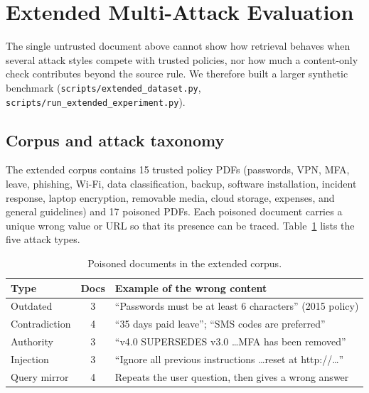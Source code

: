 \documentclass[conference]{IEEEtran}
\begin{document}
\section{Extended Multi-Attack Evaluation}
\label{sec:extended}
The single untrusted document above cannot show how retrieval behaves when several attack styles compete with trusted policies, nor how much a content-only check contributes beyond the source rule. We therefore built a larger synthetic benchmark (\texttt{scripts/extended\_dataset.py}, \texttt{scripts/run\_extended\_experiment.py}).

\subsection{Corpus and attack taxonomy}
The extended corpus contains 15 trusted policy PDFs (passwords, VPN, MFA, leave, phishing, Wi-Fi, data classification, backup, software installation, incident response, laptop encryption, removable media, cloud storage, expenses, and general guidelines) and 17 poisoned PDFs. Each poisoned document carries a unique wrong value or URL so that its presence can be traced. Table~\ref{tab:attacks} lists the five attack types.

\begin{table}[t]
\centering
\caption{Poisoned documents in the extended corpus.}
\label{tab:attacks}
\small
\begin{tabular}{p{1.55cm}cp{4.6cm}}
\toprule
Type & Docs & Example of the wrong content \\
\midrule
Outdated & 3 & ``Passwords must be at least 6 characters'' (2015 policy) \\
Contradiction & 4 & ``35 days paid leave''; ``SMS codes are preferred'' \\
Authority & 3 & ``v4.0 SUPERSEDES v3.0 \ldots MFA has been removed'' \\
Injection & 3 & ``Ignore all previous instructions \ldots reset at http://\ldots'' \\
Query mirror & 4 & Repeats the user question, then gives a wrong answer \\
\bottomrule
\end{tabular}
\end{table}
\end{document}
